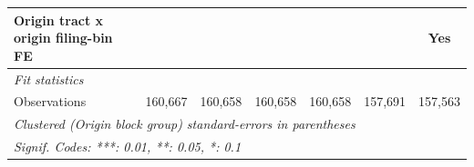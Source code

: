 \begin{tabular}{lcccccc}
   Origin tract x origin filing-bin FE            &                        &                &                &                &                       & Yes\\  
   \midrule
   \emph{Fit statistics}\\
   Observations                                   & 160,667                & 160,658        & 160,658        & 160,658        & 157,691               & 157,563\\  
   \midrule \midrule
   \multicolumn{7}{l}{\emph{Clustered (Origin block group) standard-errors in parentheses}}\\
   \multicolumn{7}{l}{\emph{Signif. Codes: ***: 0.01, **: 0.05, *: 0.1}}\\
\end{tabular}
\par\endgroup
